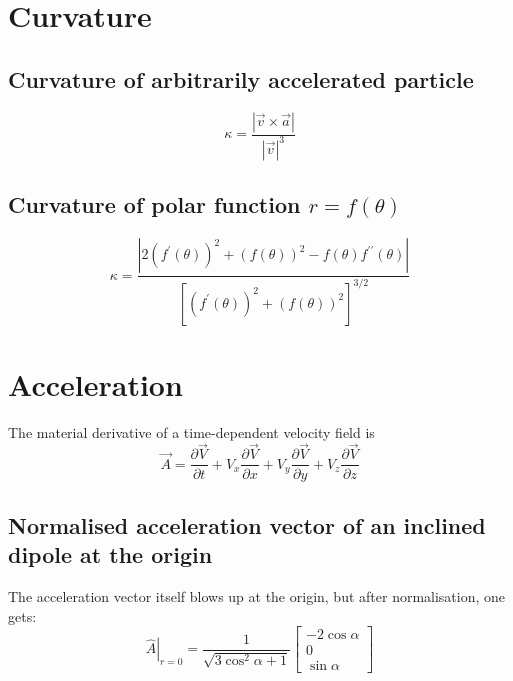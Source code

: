 \documentclass{book}
\newcommand{\pd}[2]{\frac{\partial {#1}}{\partial {#2}}}
\begin{document}
\section{Curvature}

\subsection{Curvature of arbitrarily accelerated particle}

\begin{equation}
    \kappa = \frac{|\vec{v}\times\vec{a}|}{|\vec{v}|^3}
\end{equation}

\subsection{Curvature of polar function $r = f(\theta)$}

\begin{equation}
    \kappa = \frac{|2(f^\prime(\theta))^2 + (f(\theta))^2 - f(\theta)f^{\prime\prime}(\theta)|}{\left[(f^\prime(\theta))^2 + (f(\theta))^2\right]^{3/2}}
    \label{eqn:curvature_polar}
\end{equation}

\section{Acceleration}

The material derivative of a time-dependent velocity field is
\begin{equation}
    \vec{A} = \pd{\vec{V}}{t} + V_x\pd{\vec{V}}{x} + V_y\pd{\vec{V}}{y} + V_z\pd{\vec{V}}{z}
\end{equation}

\subsection{Normalised acceleration vector of an inclined dipole at the origin}

The acceleration vector itself blows up at the origin, but after normalisation, one gets:
\begin{equation}
    \left.\hat{A}\right|_{r=0} = \frac{1}{\sqrt{3\cos^2\alpha+1}}\begin{bmatrix} -2\cos\alpha \\ 0 \\ \sin\alpha \end{bmatrix}
\end{equation}
\end{document}
